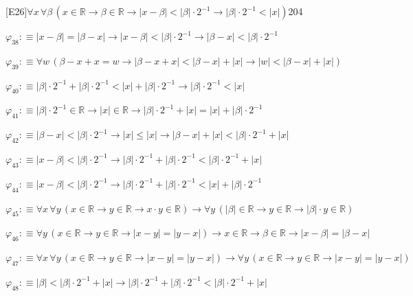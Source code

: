 \begin{fullproof}{[E26]}{$\forall x\,\forall \beta\,(x \in \mathbb{R} \to \beta \in \mathbb{R} \to \lvert x - \beta \rvert < \lvert \beta \rvert \cdot 2^{-1} \to \lvert \beta \rvert \cdot 2^{-1} < \lvert x \rvert)$}{204}
\begin{abbrevlist}
\item $\varphi_{38} :\equiv \lvert x - \beta \rvert = \lvert \beta - x \rvert \to \lvert x - \beta \rvert < \lvert \beta \rvert \cdot 2^{-1} \to \lvert \beta - x \rvert < \lvert \beta \rvert \cdot 2^{-1}$
\item $\varphi_{39} :\equiv \forall w\,(\beta - x + x = w \to \lvert \beta - x + x \rvert < \lvert \beta - x \rvert + \lvert x \rvert \to \lvert w \rvert < \lvert \beta - x \rvert + \lvert x \rvert)$
\item $\varphi_{40} :\equiv \lvert \beta \rvert \cdot 2^{-1} + \lvert \beta \rvert \cdot 2^{-1} < \lvert x \rvert + \lvert \beta \rvert \cdot 2^{-1} \to \lvert \beta \rvert \cdot 2^{-1} < \lvert x \rvert$
\item $\varphi_{41} :\equiv \lvert \beta \rvert \cdot 2^{-1} \in \mathbb{R} \to \lvert x \rvert \in \mathbb{R} \to \lvert \beta \rvert \cdot 2^{-1} + \lvert x \rvert = \lvert x \rvert + \lvert \beta \rvert \cdot 2^{-1}$
\item $\varphi_{42} :\equiv \lvert \beta - x \rvert < \lvert \beta \rvert \cdot 2^{-1} \to \lvert x \rvert \leq \lvert x \rvert \to \lvert \beta - x \rvert + \lvert x \rvert < \lvert \beta \rvert \cdot 2^{-1} + \lvert x \rvert$
\item $\varphi_{43} :\equiv \lvert x - \beta \rvert < \lvert \beta \rvert \cdot 2^{-1} \to \lvert \beta \rvert \cdot 2^{-1} + \lvert \beta \rvert \cdot 2^{-1} < \lvert \beta \rvert \cdot 2^{-1} + \lvert x \rvert$
\item $\varphi_{44} :\equiv \lvert x - \beta \rvert < \lvert \beta \rvert \cdot 2^{-1} \to \lvert \beta \rvert \cdot 2^{-1} + \lvert \beta \rvert \cdot 2^{-1} < \lvert x \rvert + \lvert \beta \rvert \cdot 2^{-1}$
\item $\varphi_{45} :\equiv \forall x\,\forall y\,(x \in \mathbb{R} \to y \in \mathbb{R} \to x \cdot y \in \mathbb{R}) \to \forall y\,(\lvert \beta \rvert \in \mathbb{R} \to y \in \mathbb{R} \to \lvert \beta \rvert \cdot y \in \mathbb{R})$
\item $\varphi_{46} :\equiv \forall y\,(x \in \mathbb{R} \to y \in \mathbb{R} \to \lvert x - y \rvert = \lvert y - x \rvert) \to x \in \mathbb{R} \to \beta \in \mathbb{R} \to \lvert x - \beta \rvert = \lvert \beta - x \rvert$
\item $\varphi_{47} :\equiv \forall x\,\forall y\,(x \in \mathbb{R} \to y \in \mathbb{R} \to \lvert x - y \rvert = \lvert y - x \rvert) \to \forall y\,(x \in \mathbb{R} \to y \in \mathbb{R} \to \lvert x - y \rvert = \lvert y - x \rvert)$
\item $\varphi_{48} :\equiv \lvert \beta \rvert < \lvert \beta \rvert \cdot 2^{-1} + \lvert x \rvert \to \lvert \beta \rvert \cdot 2^{-1} + \lvert \beta \rvert \cdot 2^{-1} < \lvert \beta \rvert \cdot 2^{-1} + \lvert x \rvert$

\end{abbrevlist}
\end{fullproof}
